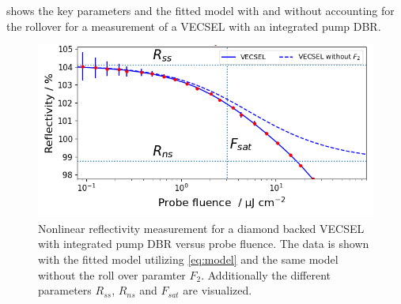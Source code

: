  shows the key parameters and the fitted model with and without accounting for the rollover for a measurement of a VECSEL with an integrated pump DBR.


\begin{figure}[ht]
    \centering
    \includegraphics[width=12cm]{images/gainSat.png}
    \caption{Nonlinear reflectivity measurement for a diamond backed VECSEL with integrated pump DBR versus probe fluence. The data is shown with the fitted model utilizing \cref{eq:model} and the same model without the roll over paramter $F_2$. Additionally the different parameters $R_{ss}$, $R_{ns}$ and $F_{sat}$ are visualized.}
    \label{fig:gainSat}
\end{figure}